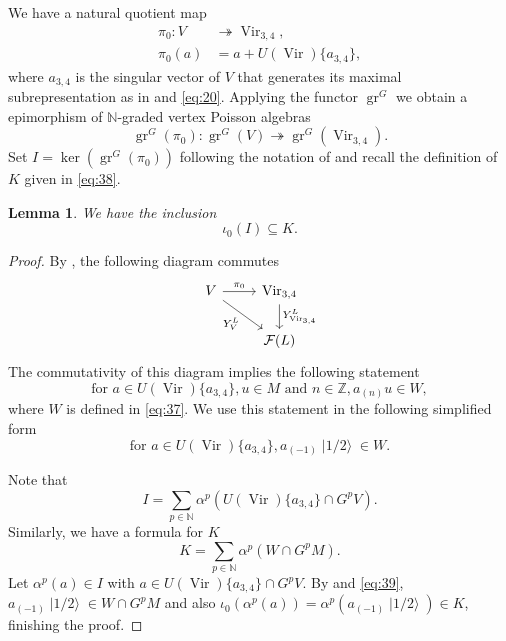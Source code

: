 \documentclass[a4paper, 12pt, reqno]{amsart}
\newtheorem{lemma}[theorem]{Lemma}
\theoremstyle{remark}
\numberwithin{equation}{subsection}
\DeclareMathOperator{\Vir}{Vir}
\DeclareMathOperator{\gr}{gr}
\DeclareMathOperator{\vachalf}{|1/2\rangle}
\begin{document}
We have a natural quotient map
\begin{align*}
  \pi_0: V &\twoheadrightarrow \Vir_{3, 4}, \\
  \pi_0(a) &= a + U(\Vir)\{a_{3, 4}\},
\end{align*}
where $a_{3, 4}$ is the singular vector of $V$ that generates its maximal subrepresentation as in \cite{andrews_singular_2022} and \eqref{eq:20}.
Applying the functor $\gr^G$ we obtain a epimorphism of $\mathbb{N}$-graded vertex Poisson algebras
\begin{equation*}
  \gr^G(\pi_0): \gr^G(V) \twoheadrightarrow \gr^G(\Vir_{3, 4}).
\end{equation*}
Set $I = \ker(\gr^G(\pi_0))$ following the notation of \cite{andrews_singular_2022} and recall the definition of $K$ given in \eqref{eq:38}.

\begin{lemma}
  \label{lmm:28}
  We have the inclusion
  \begin{equation*}
    \iota_0(I) \subseteq K.
  \end{equation*}
\end{lemma}

\begin{proof}
  By , the following diagram commutes
  \begin{equation*}
    \begin{tikzcd}
      V \arrow[r, "\pi_0"] \arrow[rd, "{Y^L_{V}}"'] & {\Vir_{3, 4}} \arrow[d, "{Y^L_{\Vir_{3, 4}}}"] \\
      & {\mathcal{F}(L)}
    \end{tikzcd}
  \end{equation*}
  The commutativity of this diagram implies the following statement
  \begin{equation*}
    \text{for }a \in U(\Vir)\{a_{3, 4}\}, u \in M\text{ and }n \in \mathbb{Z}, a_{(n)}u \in W,
  \end{equation*}
  where $W$ is defined in \eqref{eq:37}.
  We use this statement in the following simplified form
  \begin{equation}
    \label{eq:39}
    \text{for }a \in U(\Vir)\{a_{3, 4}\}, a_{(-1)}\vachalf \in W.
  \end{equation}

  Note that
  \begin{equation*}
    I = \sum_{p \in \mathbb{N}}\alpha^p(U(\Vir)\{a_{3, 4}\} \cap G^pV).
  \end{equation*}
  Similarly, we have a formula for $K$
  \begin{equation*}
    K = \sum_{p \in \mathbb{N}}\alpha^p(W \cap G^pM).
  \end{equation*}
  Let $\alpha^p(a) \in I$ with $a \in U(\Vir)\{a_{3, 4}\} \cap G^pV$.
  By  and \eqref{eq:39}, $a_{(-1)}\vachalf \in W \cap G^pM$ and also $\iota_0(\alpha^p(a)) = \alpha^p(a_{(-1)}\vachalf) \in K$, finishing the proof.
\end{proof}
\end{document}
